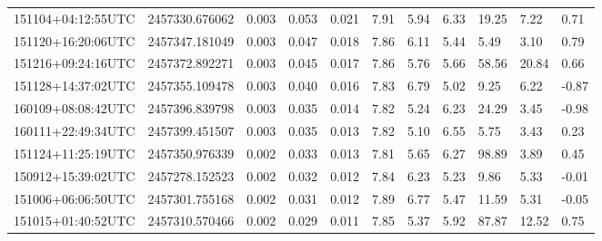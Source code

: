 \begin{table}
\begin{tabularx}{1.0\textwidth}{lllllllllll}
151104+04:12:55UTC & 2457330.676062 & 0.003 & 0.053 &      0.021 & 7.91 & 5.94 & 6.33 & 19.25 & 7.22 & 0.71\\
151120+16:20:06UTC & 2457347.181049 & 0.003 & 0.047 &      0.018 & 7.86 & 6.11 & 5.44 & 5.49 & 3.10 & 0.79\\
151216+09:24:16UTC & 2457372.892271 & 0.003 & 0.045 &      0.017 & 7.86 & 5.76 & 5.66 & 58.56 & 20.84 & 0.66\\
151128+14:37:02UTC & 2457355.109478 & 0.003 & 0.040 &      0.016 & 7.83 & 6.79 & 5.02 & 9.25 & 6.22 & -0.87\\
160109+08:08:42UTC & 2457396.839798 & 0.003 & 0.035 &      0.014 & 7.82 & 5.24 & 6.23 & 24.29 & 3.45 & -0.98\\
160111+22:49:34UTC & 2457399.451507 & 0.003 & 0.035 &      0.013 & 7.82 & 5.10 & 6.55 & 5.75 & 3.43 & 0.23\\
151124+11:25:19UTC & 2457350.976339 & 0.002 & 0.033 &      0.013 & 7.81 & 5.65 & 6.27 & 98.89 & 3.89 & 0.45\\
150912+15:39:02UTC & 2457278.152523 & 0.002 & 0.032 &      0.012 & 7.84 & 6.23 & 5.23 & 9.86 & 5.33 & -0.01\\
151006+06:06:50UTC & 2457301.755168 & 0.002 & 0.031 &      0.012 & 7.89 & 6.77 & 5.47 & 11.59 & 5.31 & -0.05\\
151015+01:40:52UTC & 2457310.570466 & 0.002 & 0.029 &      0.011 & 7.85 & 5.37 & 5.92 & 87.87 & 12.52 & 0.75\\

\end{tabularx}
\end{table}
